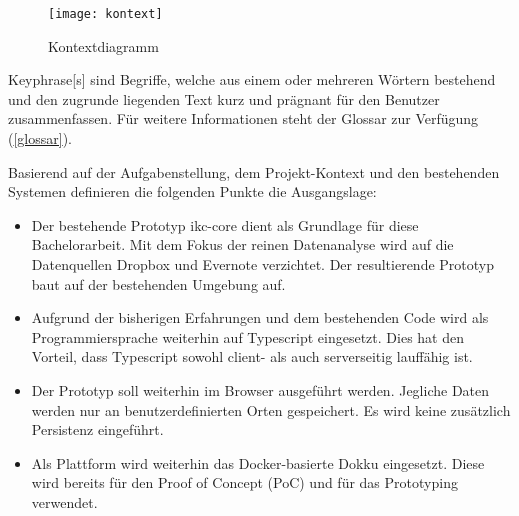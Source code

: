 \begin{figure}[H]
\centering
\texttt{[image: kontext]}
\caption{Kontextdiagramm}
\label{fig:kontextdiagramm}
\end{figure}

\gls{Keyphrase}[s] sind Begriffe, welche aus einem oder mehreren Wörtern bestehend und den zugrunde liegenden Text kurz und prägnant für den Benutzer zusammenfassen. Für weitere Informationen steht der Glossar zur Verfügung (\autoref{glossar}).

Basierend auf der Aufgabenstellung, dem Projekt-Kontext und den bestehenden Systemen definieren die folgenden Punkte die Ausgangslage:
\begin{itemize}
    \item Der bestehende Prototyp \gls{ikc-core} dient als Grundlage für diese Bachelorarbeit. Mit dem Fokus der reinen Datenanalyse wird auf die Datenquellen Dropbox und Evernote verzichtet. Der resultierende Prototyp baut auf der bestehenden Umgebung auf.
    \item Aufgrund der bisherigen Erfahrungen und dem bestehenden Code wird als Programmiersprache weiterhin auf \gls{Typescript} eingesetzt. Dies hat den Vorteil, dass \gls{Typescript} sowohl client- als auch serverseitig lauffähig ist.
    \item Der Prototyp soll weiterhin im Browser ausgeführt werden. Jegliche Daten werden nur an benutzerdefinierten Orten gespeichert. Es wird keine zusätzlich Persistenz eingeführt.
    \item Als Plattform wird weiterhin das Docker-basierte \gls{Dokku} eingesetzt. Diese wird bereits für den Proof of Concept (\gls{PoC}) und für das Prototyping verwendet.
\end{itemize}

